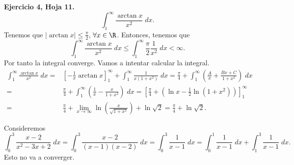 \begin{eg}
\normalfont \textbf{Ejercicio 4, Hoja 11.} 
\[\int^{\infty}_{1} \frac{\arctan x}{x^{2}} \; dx .\]
Tenemos que $\displaystyle \left|\arctan x\right|\leq \frac{\pi  }{2} $, $\displaystyle \forall x \in \R $. Entonces, tenemos que
\[ \int^{\infty}_{1} \frac{\arctan x}{x^{2}}\; dx \leq \int^{\infty}_{1} \frac{\pi }{2}\frac{1}{x^{2}} \; dx < \infty .\]
Por tanto la integral converge. Vamos a intentar calcular la integral.
\[
\begin{split}
	\int^{\infty}_{1} \frac{\arctan x}{x^{2}} \; dx = & \left[-\frac{1}{x}\arctan x\right] ^{\infty}_{1} + \int^{\infty}_{1} \frac{1}{x\left(1+x^{2}\right)} \; dx = \frac{\pi }{4} + \int^{\infty}_{1} \left(\frac{A}{x} + \frac{Bx + C}{1 + x^{2}}\right) \; dx \\
= & \frac{\pi }{4} + \int^{\infty}_{1} \left(\frac{1}{x} - \frac{x}{1+x^{2}}\right) \; dx = \left[ \frac{\pi }{4} + \left(\ln x - \frac{1}{2}\ln\left(1+x^{2}\right)\right)\right]^{\infty}_{1} \\
= & \frac{\pi }{4} + \lim_{x \to \infty}\ln\left(\frac{x}{\sqrt{1+x^{2}}}\right)+\ln\sqrt{2} = \frac{\pi }{4} + \ln\sqrt{2}.
\end{split}
\]
\end{eg}
\begin{eg}
\normalfont Consideremos 
\[\int^{3}_{0} \frac{x-2}{x^{2}-3x+2} \; dx = \int^{3}_{0} \frac{x-2}{\left(x-1\right)\left(x-2\right)} \; dx= \int^{3}_{0} \frac{1}{x-1} \; dx = \int^{1}_{0} \frac{1}{x-1} \; dx + \int^{3}_{1} \frac{1}{x-1} \; dx.\]
Esto no va a converger.
\end{eg}
